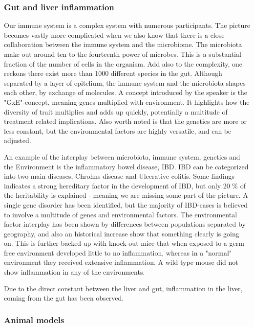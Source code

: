 \documentclass[12p]{article}
\begin{document}
\subsubsection{Gut and liver inflammation}

Our immune system is a complex system with numerous participants.
The picture becomes vastly more complicated when we also know that there is a close collaboration between the immune system and the microbiome.
The microbiota make out around ten to the fourteenth power of microbes.
This is a substantial fraction of the number of cells in the organism.
Add also to the complexity, one reckons there exist more than 1000 different species in the gut.
Although separated by a layer of epitelium, the immune system and the microbiota shapes each other, by exchange of molecules.
A concept introduced by the speaker is the "GxE"-concept, meaning genes multiplied with environment.
It highlights how the diversity of trait multiplies and adds up quickly, potentially a multitude of treatment related implications.
Also worth noted is that the genetics are more or less constant, but the environmental factors are highly versatile, and can be adjusted.

An example of the interplay between microbiota, immune system, genetics and the Environment is the inflammatory bowel disease, IBD.
IBD can be categorized into two main diseases, Chrohns disease and Ulcerative colitis.
Some findings indicates a strong hereditary factor in the development of IBD, but only 20 \% of the heritability is explained - meaning we are missing some part of the picture.
A single gene disorder has been identified, but the majority of IBD-cases is believed to involve a multitude of genes and environmental factors.
The environmental factor interplay has been shown by differences between populations separated by geography, and also an historical increase show that something clearly is going on.
This is further backed up with knock-out mice that when exposed to a germ free environment developed little to no inflammation, whereas in a "normal" environment they received extensive inflammation.
A wild type mouse did not show inflammation in any of the environments.

Due to the direct constant between the liver and gut, inflammation in the liver, coming from the gut has been observed.

\subsubsection{Animal models}
\end{document}
